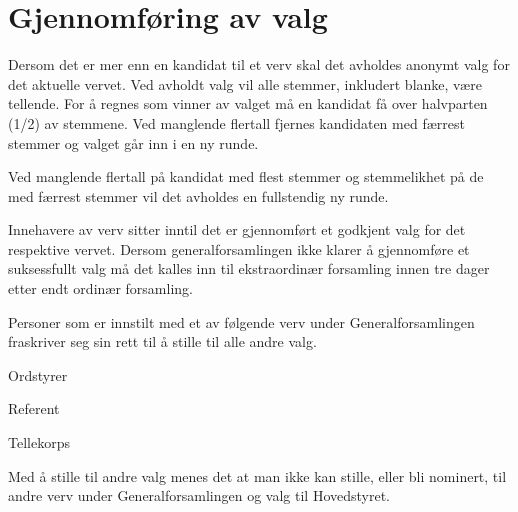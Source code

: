 \section{Gjennomføring av valg}{
Dersom det er mer enn en kandidat til et verv skal det avholdes anonymt valg for det aktuelle vervet. Ved
avholdt valg vil alle stemmer, inkludert blanke, være \linebreak tellende. For å regnes som vinner av valget må en kandidat få over halvparten (1/2) av stemmene. Ved manglende flertall fjernes kandidaten med færrest stemmer \linebreak og valget går inn i en ny runde. \newline

Ved manglende flertall på kandidat med flest stemmer og stemmelikhet på de med færrest stemmer vil det
avholdes en fullstendig ny runde. \newline

Innehavere av verv sitter inntil det er gjennomført et godkjent valg for det respektive vervet. Dersom
generalforsamlingen ikke klarer å gjennomføre et suksessfullt valg må det kalles inn til ekstraordinær
forsamling innen tre dager etter endt ordinær forsamling.

	 {
	Personer som er innstilt med et av følgende verv under Generalforsamlingen fraskriver seg sin rett til å stille til alle andre valg.
	\begin{liste}
		\item Ordstyrer
		\item Referent
		\item Tellekorps
	\end{liste}
	Med å stille til andre valg menes det at man ikke kan stille, eller
	bli nominert, til andre verv under Generalforsamlingen og valg til
	Hovedstyret.
	}
}
